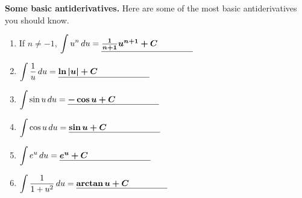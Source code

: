\documentclass[main]{subfiles}
\begin{document}
\begin{framed}
  \textbf{Some basic antiderivatives.} Here are some of the most basic
  antiderivatives you should know.
\begin{enumerate}[topsep=0pt]
      
    \item If $n \neq -1$, $\displaystyle \int u^n\,du = \fitb{1.5in}{\frac{1}{n
        + 1} u^{n + 1} + C}$

    \item $\displaystyle \int \frac{1}{u}\,du = \fitb{1.5in}{\ln |u| + C}$

    \item $\displaystyle \int \sin u\,du = \fitb{1.5in}{-\cos u + C}$

    \item $\displaystyle \int \cos u\,du = \fitb{1.5in}{\sin u + C}$

    \item $\displaystyle \int e^u\,du = \fitb{1.5in}{e^u + C}$

    \item $\displaystyle \int \frac{1}{1 + u^2}\,du = \fitb{1.5in}{\arctan u +
      C}$
\end{enumerate}
  
\end{framed}
\end{document}
